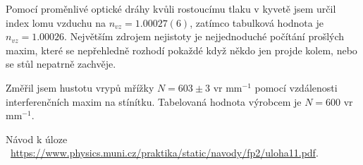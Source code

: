 \documentclass[a4paper,11pt]{article}
\begin{document}
Pomocí proměnlivé optické dráhy kvůli rostoucímu tlaku v kyvetě jsem určil index lomu vzduchu na $ n_{vz} = 1.00027(6) $, zatímco tabulková hodnota je $ n_{vz} = 1.00026 $. Největším zdrojem nejistoty je nejjednoduché počítání prošlých maxim, které se nepřehledně rozhodí pokaždé když někdo jen projde kolem, nebo se stůl nepatrně zachvěje.

Změřil jsem hustotu vrypů mřížky $ N = 603 \pm 3 $ vr mm$ ^{-1} $ pomocí vzdálenosti interferenčních maxim na stínítku. Tabelovaná hodnota výrobcem je $ N = 600 $ vr mm$ ^{-1} $.

\begin{thebibliography}{0}
 Návod k úloze ~\url{https://www.physics.muni.cz/praktika/static/navody/fp2/uloha11.pdf}.   
\end{thebibliography}
\end{document}
